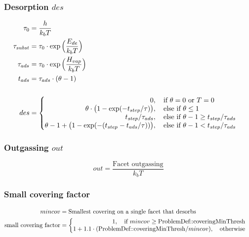 \subsubsection*{Desorption $des$}
\begin{equation}
	\label{eq:des}
	\begin{split}
	\tau_0&=\frac{h}{k_b T}\\
	\tau_{subst} &=\tau_0 \cdot \exp\Big(\frac{E_{de}}{k_b T}\Big)\\
	\tau_{ads}&=\tau_0 \cdot \exp\Big(\frac{H_{vap}}{k_b T}\Big)\\
	t_{ads}&=\tau_{ads} \cdot (\theta -1)\\
	&\\
	des&=
	\begin{cases}
		\begin{split}
		0&,  \text{\quad if}\ \theta = 0 \ \text{or}\ T=0\\
		\theta \cdot \big(1-\exp(-t_{step}/\tau)\big)&, \text{\quad else if}\ \theta \leq 1\\
		t_{step}/\tau_{ads}&, \text{\quad else if}\ \theta -1 \geq t_{step}/\tau_{ads}\\
		\theta - 1 + \big(1-\exp(-(t_{step}-t_{ads}/\tau))\big)&, \text{\quad else if}\ \theta -1 < t_{step}/\tau_{ads}\\
		\end{split}
	\end{cases}
	\end{split}
\end{equation}

\subsubsection*{Outgassing $out$}
\begin{equation}
	\label{eq:out}
	out=\frac{\text{Facet outgassing}}{k_b T}
\end{equation}

\subsubsection*{Small covering factor}
\begin{equation}
	\label{eq:smallcov}
	\begin{split}
	mincov&=\text{Smallest covering on a single facet that desorbs}\\
	\text{small covering factor}&=
	\begin{cases}
		\begin{split}
		1,  \text{\quad if}\ mincov \geq \text{ProblemDef::coveringMinThresh}\\
		1+1.1 \cdot (\text{ProblemDef::coveringMinThresh}/mincov), \text{\quad otherwise}\\
		\end{split}
	\end{cases}
	\end{split}
\end{equation}

